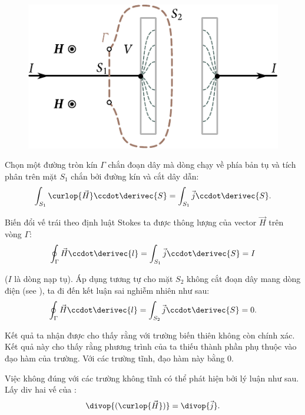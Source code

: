 \begin{figure}[t]
	\begin{center}
		\includegraphics[scale=1]{figures/ch_09/fig_9_1.pdf}
		\caption[]{}
		\label{fig:9_1}
	\end{center}
	\vspace{-0.8cm}
\end{figure}

Chọn một đường tròn kín $\Gamma$ chắn đoạn dây mà dòng chạy về phía bản tụ và tích phân   trên mặt $S_1$ chắn bởi đường kín và cắt dây dẫn:
\begin{equation*}
    \int_{S_1} \curlop{\vec{H}} \ccdot \derivec{S} = \int_{S_1} \vec{j} \ccdot \derivec{S}.
\end{equation*}

\noindent
Biến đổi vế trái theo định luật Stokes ta được thông lượng của vector $\vec{H}$ trên vòng $\Gamma$:
\begin{equation}\label{eq:9_6}
    \oint_{\Gamma} \vec{H} \ccdot \derivec{l} = \int_{S_1} \vec{j} \ccdot \derivec{S} = I
\end{equation}

\noindent
($I$ là dòng nạp tụ).
Áp dụng tương tự cho mặt $S_2$ không cắt đoạn dây mang dòng điện (see ), ta đi đến kết luận sai nghiễm nhiên như sau:
\begin{equation}\label{eq:9_7}
    \oint_{\Gamma} \vec{H} \ccdot \derivec{l} = \int_{S_2} \vec{j} \ccdot \derivec{S} = 0.
\end{equation}

\noindent
Kết quả ta nhận được cho thấy rằng với trường biến thiên  không còn chính xác.
Kết quả này cho thấy rằng phương trình của ta thiếu thành phần phụ thuộc vào đạo hàm của trường.
Với các trường tĩnh, đạo hàm này bằng 0.

Việc  không đúng với các trường không tĩnh có thể phát hiện bởi lý luận như sau.
Lấy div hai vế của :
\begin{equation*}
    \divop{(\curlop{\vec{H}})} = \divop{\vec{j}}.
\end{equation*}


